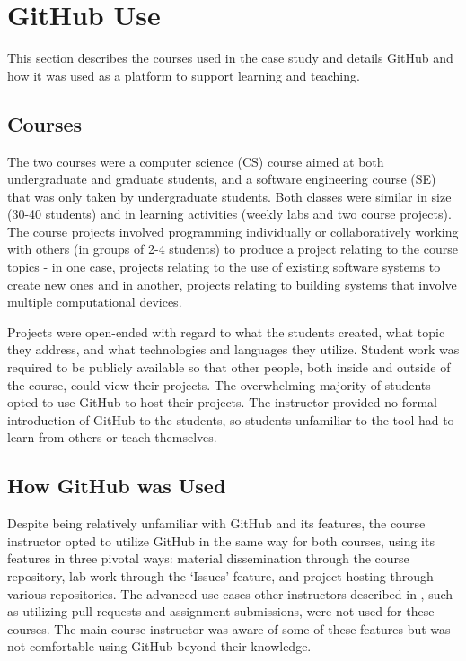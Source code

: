 \section{GitHub Use}
This section describes the courses used in the case study and details GitHub and how it was used as a platform to support learning and teaching.

\subsection{Courses}
The two courses were a computer science (CS) course aimed at both undergraduate and graduate students, and a software engineering course (SE) that was only taken by undergraduate students. Both classes were similar in size (30-40 students) and in learning activities (weekly labs and two course projects). The course projects involved programming individually or collaboratively working with others (in groups of 2-4 students) to produce a project relating to the course topics - in one case, projects relating to the use of existing software systems to create new ones and in another, projects relating to building systems that involve multiple computational devices.

Projects were open-ended with regard to what the students created, what topic they address, and what technologies and languages they utilize. Student work was required to be publicly available so that other people, both inside and outside of the course, could view their projects. The overwhelming majority of students opted to use GitHub to host their projects. The instructor provided no formal introduction of GitHub to the students, so students unfamiliar to the tool had to learn from others or teach themselves. %

\subsection{How GitHub was Used}
Despite being relatively unfamiliar with GitHub and its features, the course instructor opted to utilize GitHub in the same way for both courses, using its features in three pivotal ways: material dissemination through the course repository, lab work through the `Issues' feature, and project hosting through various repositories. The advanced use cases other instructors described in \cite{zagalsky2015emergence}, such as utilizing pull requests and assignment submissions, were not used for these courses. The main course instructor was aware of some of these features but was not comfortable using GitHub beyond their knowledge.

